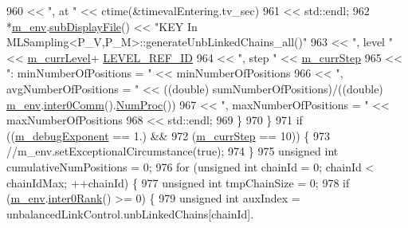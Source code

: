 \begin{DoxyCode}
960                               << \textcolor{stringliteral}{", at "}                  << ctime(&timevalEntering.tv\_sec)
961                               << std::endl;
962       *\hyperlink{class_q_u_e_s_o_1_1_m_l_sampling_a13f1ca4fe9f94822fe572a743eaced1d}{m\_env}.\hyperlink{class_q_u_e_s_o_1_1_base_environment_a8a0064746ae8dddfece4229b9ad374d6}{subDisplayFile}() << \textcolor{stringliteral}{"KEY In
       MLSampling<P\_V,P\_M>::generateUnbLinkedChains\_all()"}
963                               << \textcolor{stringliteral}{", level "}                  << \hyperlink{class_q_u_e_s_o_1_1_m_l_sampling_af9416874c856e50f3b35270e801f17e4}{m\_currLevel}+
      \hyperlink{_m_l_sampling_level_options_8h_a68d15eaf394d210effcf584b938206d3}{LEVEL\_REF\_ID}
964                               << \textcolor{stringliteral}{", step "}                   << \hyperlink{class_q_u_e_s_o_1_1_m_l_sampling_a1b1f8ccb4823bdfa26ec652f0807c63e}{m\_currStep}
965                               << \textcolor{stringliteral}{": minNumberOfPositions = "} << minNumberOfPositions
966                               << \textcolor{stringliteral}{", avgNumberOfPositions = "} << ((double) sumNumberOfPositions)/((double) 
      \hyperlink{class_q_u_e_s_o_1_1_m_l_sampling_a13f1ca4fe9f94822fe572a743eaced1d}{m\_env}.\hyperlink{class_q_u_e_s_o_1_1_base_environment_a689e4d140c74d495d97eb498714a4b82}{inter0Comm}().\hyperlink{class_q_u_e_s_o_1_1_mpi_comm_aa780721ae0fdeabc5a15e04cb0cad964}{NumProc}())
967                               << \textcolor{stringliteral}{", maxNumberOfPositions = "} << maxNumberOfPositions
968                               << std::endl;
969     \}
970   \}
971   \textcolor{keywordflow}{if} ((\hyperlink{class_q_u_e_s_o_1_1_m_l_sampling_abdd5cd35419283c33cc40a77d0f4f07f}{m\_debugExponent} == 1.) &&
972       (\hyperlink{class_q_u_e_s_o_1_1_m_l_sampling_a1b1f8ccb4823bdfa26ec652f0807c63e}{m\_currStep}      == 10)) \{
973     \textcolor{comment}{//m\_env.setExceptionalCircumstance(true);}
974   \}
975   \textcolor{keywordtype}{unsigned} \textcolor{keywordtype}{int} cumulativeNumPositions = 0;
976   \textcolor{keywordflow}{for} (\textcolor{keywordtype}{unsigned} \textcolor{keywordtype}{int} chainId = 0; chainId < chainIdMax; ++chainId) \{
977     \textcolor{keywordtype}{unsigned} \textcolor{keywordtype}{int} tmpChainSize = 0;
978     \textcolor{keywordflow}{if} (\hyperlink{class_q_u_e_s_o_1_1_m_l_sampling_a13f1ca4fe9f94822fe572a743eaced1d}{m\_env}.\hyperlink{class_q_u_e_s_o_1_1_base_environment_ae106b5bb8a80b655b88b3a26b1e7c185}{inter0Rank}() >= 0) \{
979       \textcolor{keywordtype}{unsigned} \textcolor{keywordtype}{int} auxIndex = unbalancedLinkControl.unbLinkedChains[chainId].

\end{DoxyCode}
